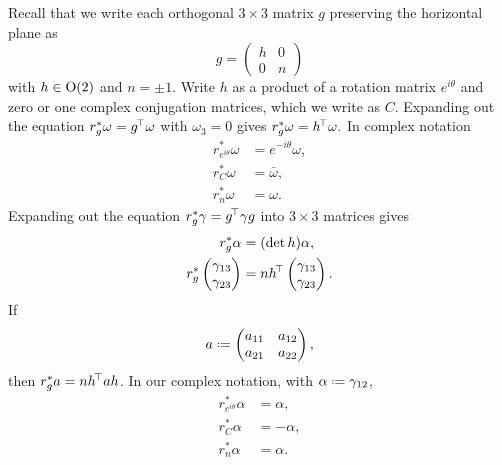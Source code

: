 Recall that we write each orthogonal \(3\times 3\) matrix \(g\) preserving the horizontal plane as
\[
 g=\begin{pmatrix}
    h & 0 \\
    0 & n
   \end{pmatrix}
\]
with \(h \in \textrm{O}\!\left(2\right)\) and \(n=\pm 1\).
Write \(h\) as a product of a rotation matrix \(e^{i\theta}\) and zero or one complex conjugation matrices, which we write as \(C\).
Expanding out the equation \(r_g^* \omega=g^{\!\top} \omega\) with \(\omega_3=0\) gives
\(
r_g^*\omega=h^{\!\top} \omega.
\)
In complex notation
\begin{align*}
r_{e^{i\theta}}^* \omega &= e^{-i\theta}\omega,\\
r_{C}^*\omega &= \bar\omega,\\
r_n^*\omega &= \omega.
\end{align*}
Expanding out the equation \(r_g^* \gamma=g^{\!\top} \gamma g\) into \(3 \times 3\) matrices gives
\begin{align*}
r_g^* \alpha &= (\det h)\alpha, \\
r_g^* 
\begin{pmatrix}
\gamma_{13} \\
\gamma_{23}
\end{pmatrix}
&=
n
h^{\!\top}
\begin{pmatrix}
\gamma_{13} \\
\gamma_{23}
\end{pmatrix}.
\end{align*}
If
\[
a\defeq
\begin{pmatrix}
a_{11} & a_{12} \\
a_{21} & a_{22}
\end{pmatrix},
\]
then \(r_g^*a = nh^{\!\top}ah\).
In our complex notation, with \(\alpha\defeq\gamma_{12}\),
\begin{align*}
r_{e^{i\theta}}^*\alpha &= \alpha,\\
r_C^*\alpha &= -\alpha,\\
r_n^*\alpha &= \alpha.
\end{align*}

